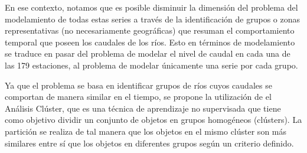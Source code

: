 \documentclass[12pt,oneside]{book}\usepackage[]{graphicx}\usepackage[]{color}
\theoremstyle{definition} %
\begin{document}
En ese contexto, notamos que es posible disminuir la dimensión del problema del modelamiento de todas estas series a través de la identificación de grupos o zonas representativas (no necesariamente geográficas) que resuman el comportamiento temporal que poseen los caudales de los ríos. Esto en términos de modelamiento se traduce en pasar del problema de modelar el nivel de caudal en cada una de las 179 estaciones, al problema de modelar únicamente una serie por cada grupo.






Ya que el problema se basa en identificar grupos de ríos cuyos caudales se comportan de manera similar en el tiempo, se propone la utilización de el Análisis Clúster, que es una técnica de aprendizaje no supervisada que tiene como objetivo dividir un conjunto de objetos en grupos homogéneos (clústers). La partición se realiza de tal manera que los objetos en el mismo clúster son más similares entre sí que los objetos en diferentes grupos según un criterio definido. 
\end{document}
